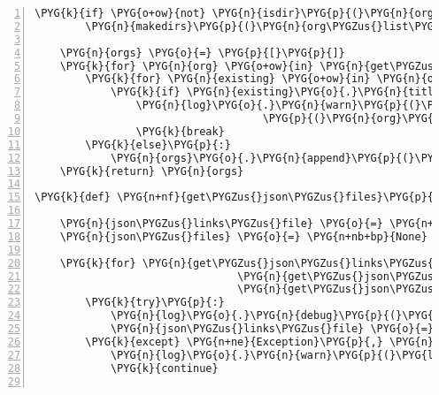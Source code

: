 \begin{Verbatim}[commandchars=\\\{\},numbers=left,firstnumber=1,stepnumber=5]
    \PYG{k}{if} \PYG{o+ow}{not} \PYG{n}{isdir}\PYG{p}{(}\PYG{n}{org\PYGZus{}list\PYGZus{}cache\PYGZus{}dir}\PYG{p}{)}\PYG{p}{:}
        \PYG{n}{makedirs}\PYG{p}{(}\PYG{n}{org\PYGZus{}list\PYGZus{}cache\PYGZus{}dir}\PYG{p}{)}

    \PYG{n}{orgs} \PYG{o}{=} \PYG{p}{[}\PYG{p}{]}
    \PYG{k}{for} \PYG{n}{org} \PYG{o+ow}{in} \PYG{n}{get\PYGZus{}organisms}\PYG{p}{(}\PYG{n}{get\PYGZus{}json\PYGZus{}files}\PYG{p}{(}\PYG{p}{)}\PYG{p}{)}\PYG{p}{:}
        \PYG{k}{for} \PYG{n}{existing} \PYG{o+ow}{in} \PYG{n}{orgs}\PYG{p}{:}
            \PYG{k}{if} \PYG{n}{existing}\PYG{o}{.}\PYG{n}{title} \PYG{o}{==} \PYG{n}{org}\PYG{o}{.}\PYG{n}{title}\PYG{p}{:}
                \PYG{n}{log}\PYG{o}{.}\PYG{n}{warn}\PYG{p}{(}\PYG{l+s}{"}\PYG{l+s}{'}\PYG{l+s+si}{\PYGZpc{}s}\PYG{l+s}{'}\PYG{l+s}{ already present (db: }\PYG{l+s+si}{\PYGZpc{}s}\PYG{l+s}{/}\PYG{l+s+si}{\PYGZpc{}s}\PYG{l+s}{)}\PYG{l+s}{"} \PYG{o}{\PYGZpc{}} \PYGZbs{}
                                    \PYG{p}{(}\PYG{n}{org}\PYG{o}{.}\PYG{n}{title}\PYG{p}{,} \PYG{n}{org}\PYG{o}{.}\PYG{n}{db}\PYG{p}{,} \PYG{n}{existing}\PYG{o}{.}\PYG{n}{db}\PYG{p}{)}\PYG{p}{)}
                \PYG{k}{break}
        \PYG{k}{else}\PYG{p}{:}
            \PYG{n}{orgs}\PYG{o}{.}\PYG{n}{append}\PYG{p}{(}\PYG{n}{org}\PYG{p}{)}
    \PYG{k}{return} \PYG{n}{orgs}

\PYG{k}{def} \PYG{n+nf}{get\PYGZus{}json\PYGZus{}files}\PYG{p}{(}\PYG{p}{)}\PYG{p}{:}

    \PYG{n}{json\PYGZus{}links\PYGZus{}file} \PYG{o}{=} \PYG{n+nb+bp}{None}
    \PYG{n}{json\PYGZus{}files} \PYG{o}{=} \PYG{n+nb+bp}{None}

    \PYG{k}{for} \PYG{n}{get\PYGZus{}json\PYGZus{}links\PYGZus{}file} \PYG{o+ow}{in} \PYG{p}{(}\PYG{n}{get\PYGZus{}json\PYGZus{}links\PYGZus{}file\PYGZus{}web}\PYG{p}{,}
                                \PYG{n}{get\PYGZus{}json\PYGZus{}links\PYGZus{}file\PYGZus{}cache}\PYG{p}{,}
                                \PYG{n}{get\PYGZus{}json\PYGZus{}links\PYGZus{}file\PYGZus{}default}\PYG{p}{,}\PYG{p}{)}\PYG{p}{:}
        \PYG{k}{try}\PYG{p}{:}
            \PYG{n}{log}\PYG{o}{.}\PYG{n}{debug}\PYG{p}{(}\PYG{l+s}{"}\PYG{l+s}{trying }\PYG{l+s+si}{\PYGZpc{}s}\PYG{l+s}{"} \PYG{o}{\PYGZpc{}} \PYG{n}{get\PYGZus{}json\PYGZus{}links\PYGZus{}file}\PYG{o}{.}\PYG{n}{func\PYGZus{}name}\PYG{p}{)}
            \PYG{n}{json\PYGZus{}links\PYGZus{}file} \PYG{o}{=} \PYG{n}{get\PYGZus{}json\PYGZus{}links\PYGZus{}file}\PYG{p}{(}\PYG{p}{)}
        \PYG{k}{except} \PYG{n+ne}{Exception}\PYG{p}{,} \PYG{n}{e}\PYG{p}{:}
            \PYG{n}{log}\PYG{o}{.}\PYG{n}{warn}\PYG{p}{(}\PYG{l+s}{"}\PYG{l+s+si}{\PYGZpc{}s}\PYG{l+s}{ failed: }\PYG{l+s+si}{\PYGZpc{}r}\PYG{l+s}{"} \PYG{o}{\PYGZpc{}} \PYG{p}{(}\PYG{n}{get\PYGZus{}json\PYGZus{}links\PYGZus{}file}\PYG{o}{.}\PYG{n}{func\PYGZus{}name}\PYG{p}{,} \PYG{n}{e}\PYG{p}{)}\PYG{p}{)}
            \PYG{k}{continue}
        

\end{Verbatim}
